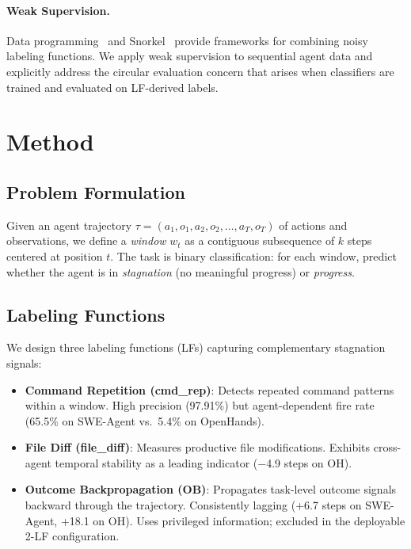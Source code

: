 \documentclass[11pt,a4paper]{article}
\begin{document}
\paragraph{Weak Supervision.}
Data programming~\cite{ratner2016} and Snorkel~\cite{ratner2020} provide frameworks for combining noisy labeling functions.
We apply weak supervision to sequential agent data and explicitly address the circular evaluation concern that arises when classifiers are trained and evaluated on LF-derived labels.

\section{Method}

\subsection{Problem Formulation}

Given an agent trajectory $\tau = (a_1, o_1, a_2, o_2, \ldots, a_T, o_T)$ of actions and observations, we define a \emph{window} $w_t$ as a contiguous subsequence of $k$ steps centered at position $t$.
The task is binary classification: for each window, predict whether the agent is in \emph{stagnation} (no meaningful progress) or \emph{progress}.

\subsection{Labeling Functions}

We design three labeling functions (LFs) capturing complementary stagnation signals:

\begin{itemize}[leftmargin=*,itemsep=2pt]
\item \textbf{Command Repetition (cmd\_rep)}: Detects repeated command patterns within a window. High precision (97.91\%) but agent-dependent fire rate (65.5\% on SWE-Agent vs.\ 5.4\% on OpenHands).
\item \textbf{File Diff (file\_diff)}: Measures productive file modifications. Exhibits cross-agent temporal stability as a leading indicator ($-$4.9 steps on OH).
\item \textbf{Outcome Backpropagation (OB)}: Propagates task-level outcome signals backward through the trajectory. Consistently lagging (+6.7 steps on SWE-Agent, +18.1 on OH). Uses privileged information; excluded in the deployable 2-LF configuration.
\end{itemize}
\end{document}
